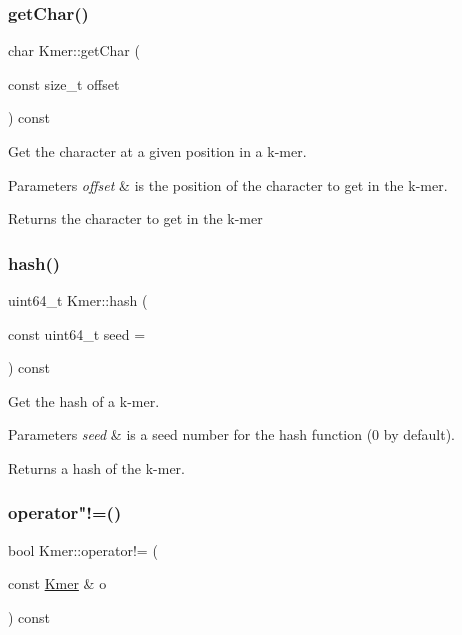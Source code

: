 \subsubsection{\texorpdfstring{get\+Char()}{getChar()}}
{\footnotesize\ttfamily char Kmer\+::get\+Char (\begin{DoxyParamCaption}\item[{const size\+\_\+t}]{offset }\end{DoxyParamCaption}) const}



Get the character at a given position in a k-\/mer. 


\begin{DoxyParams}{Parameters}
{\em offset} & is the position of the character to get in the k-\/mer. \\
\hline
\end{DoxyParams}
\begin{DoxyReturn}{Returns}
the character to get in the k-\/mer 
\end{DoxyReturn}
\mbox{\label{classKmer_a11645c016419fec967ab50743cf4c83e}} 
\subsubsection{\texorpdfstring{hash()}{hash()}}
{\footnotesize\ttfamily uint64\+\_\+t Kmer\+::hash (\begin{DoxyParamCaption}\item[{const uint64\+\_\+t}]{seed = {} }\end{DoxyParamCaption}) const\hspace{0.3cm}{\ttfamily [inline]}}



Get the hash of a k-\/mer. 


\begin{DoxyParams}{Parameters}
{\em seed} & is a seed number for the hash function (0 by default). \\
\hline
\end{DoxyParams}
\begin{DoxyReturn}{Returns}
a hash of the k-\/mer. 
\end{DoxyReturn}
\mbox{\label{classKmer_ab859842b0a779eae64aace119eec9244}} 
\subsubsection{\texorpdfstring{operator"!=()}{operator!=()}}
{\footnotesize\ttfamily bool Kmer\+::operator!= (\begin{DoxyParamCaption}\item[{const \hyperlink{classKmer}{Kmer} \&}]{o }\end{DoxyParamCaption}) const}



